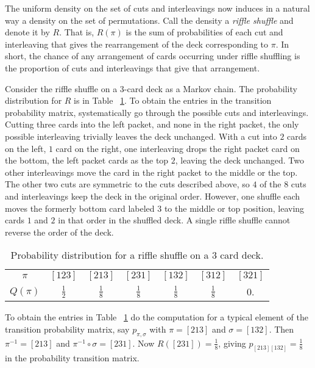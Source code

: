 \documentclass[12pt]{article}
\begin{document}
The uniform density on the set of cuts and interleavings now induces in
a natural way a density on the set of permutations.  Call the density a
\emph{riffle shuffle} and denote it by \( R \).  That is, \( R(\pi) \)
is the sum of probabilities of each cut and interleaving that gives the
rearrangement of the deck corresponding to \( \pi \).  In short, the
chance of any arrangement of cards occurring under riffle shuffling is
the proportion of cuts and interleavings that give that arrangement.

\begin{example}
    Consider the riffle shuffle on a \( 3 \)-card deck as a Markov
    chain.  The probability distribution for \( R \) is in Table~%
    \ref{tab:cardshuffling:riffle3}.  To obtain the entries in the
    transition probability matrix, systematically go through the
    possible cuts and interleavings. Cutting three cards into the left
    packet, and none in the right packet, the only possible interleaving
    trivially leaves the deck unchanged.  With a cut into \( 2 \) cards
    on the left, \( 1 \) card on the right, one interleaving drops the
    right packet card on the bottom, the left packet cards as the top \(
    2 \), leaving the deck unchanged.  Two other interleavings move the
    card in the right packet to the middle or the top.  The other two
    cuts are symmetric to the cuts described above, so \( 4 \) of the \(
    8 \) cuts and interleavings keep the deck in the original order.
    However, one shuffle each moves the formerly bottom card labeled \(
    3 \) to the middle or top position, leaving cards \( 1 \) and \( 2 \)
    in that order in the shuffled deck.  A single riffle shuffle cannot
    reverse the order of the deck.

    \begin{table}
        \centering
        \caption{Probability distribution for a riffle shuffle
          on a $ 3 $ card deck.}
        \begin{tabular}{ccccccc}
            $\pi$    & $[123]$       & $[213]$       & $[231]$       & $[132]$       & $[312]$       & $[321]$ \\ 
            $Q(\pi)$ & $\frac{1}{2}$ & $\frac{1}{8}$ & $\frac{1}{8}$ & $\frac{1}{8}$ & $\frac{1}{8}$ & 0.      \\ 
        \end{tabular}%
        \label{tab:cardshuffling:riffle3}
    \end{table}

    To obtain the entries in Table~%
    \ref{tab:cardshuffling:riffle3} do the computation for a typical
    element of the transition probability matrix, say \( p_{\pi,\sigma} \)
    with \( \pi = [213] \) and \( \sigma = [132] \).  Then \( \pi^{-1} = [213]
    \) and \( \pi^{-1} \circ \sigma = [231] \).  Now \( R([231]) = \frac{1}
    {8} \), giving \( p_{[213] [132]} = \frac{1}{8} \) in the
    probability transition matrix.


\end{example}
\end{document}
